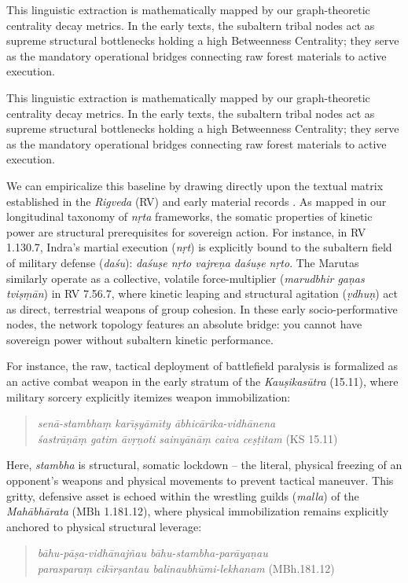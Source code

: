 \documentclass[11pt,twoside,letterpaper]{article}
\begin{document}
This linguistic extraction is mathematically mapped by our graph-theoretic centrality decay metrics. In the early texts, the subaltern tribal nodes act as supreme structural bottlenecks holding a high Betweenness Centrality; they serve as the mandatory operational bridges connecting raw forest materials to active execution. 

This linguistic extraction is mathematically mapped by our graph-theoretic centrality decay metrics. In the early texts, the subaltern tribal nodes act as supreme structural bottlenecks holding a high Betweenness Centrality; they serve as the mandatory operational bridges connecting raw forest materials to active execution. 

We can empiricalize this baseline by drawing directly upon the textual matrix established in the \textit{Rigveda} (RV) and early material records \citep{McCartney2026}. As mapped in our longitudinal taxonomy of \textit{n\d{r}ta} frameworks, the somatic properties of kinetic power are structural prerequisites for sovereign action. For instance, in RV 1.130.7, Indra's martial execution (\textit{n\d{r}t}) is explicitly bound to the subaltern field of military defense (\textit{da\'{s}u}): \textit{da\'{s}u\d{s}e n\d{r}to vajre\d{n}a da\'{s}u\d{s}e n\d{r}to}. The Marutas similarly operate as a collective, volatile force-multiplier (\textit{marudbhir ga\d{n}as tvi\d{s}\d{m}\={a}n}) in RV 7.56.7, where kinetic leaping and structural agitation (\textit{\d{v}dhu\d{n}}) act as direct, terrestrial weapons of group cohesion. In these early socio-performative nodes, the network topology features an absolute bridge: you cannot have sovereign power without subaltern kinetic performance.

For instance, the raw, tactical deployment of battlefield paralysis is formalized as an active combat weapon in the early stratum of the \textit{Kau\d{s}ikas\={u}tra} (15.11), where military sorcery explicitly itemizes weapon immobilization:
\begin{quote}
\small
\noindent\textit{sen\={a}-stambha\d{m} kar\={\i}\d{s}y\={a}m\={\i}ty \={a}bhic\={a}rika-vidh\={a}nena} \\
\noindent\textit{\'{s}astr\={a}\d{n}\={a}\d{m} gatim \={a}v\d{r}\d{n}oti sainy\={a}n\={a}\d{m} caiva ce\d{s}\d{t}itam} (KS 15.11)
\end{quote}
Here, \textit{stambha} is structural, somatic lockdown -- the literal, physical freezing of an opponent's weapons and physical movements to prevent tactical maneuver. This gritty, defensive asset is echoed within the wrestling guilds (\textit{malla}) of the \textit{Mah\={a}bh\={a}rata} (MBh 1.181.12), where physical immobilization remains explicitly anchored to physical structural leverage:
\begin{quote}
\small
\noindent\textit{b\={a}hu-p\={a}\d{s}a-vidh\={a}naj\~{n}au b\={a}hu-stambha-par\={a}ya\d{n}au } \\
\noindent\textit{paraspara\d{m} cik\={\i}r\d{s}antau balinaubh\={u}mi-lekhanam} (MBh.181.12)
\end{quote}
\end{document}
